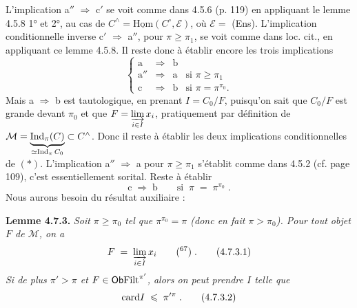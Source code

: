 L’implication a$''$ $\Longrightarrow$ c$'$ se voit comme dans 4.5.6 (p. 119) en appliquant le lemme 4.5.8 1° et 2°, au cas de $C^{\wedge} = \underline{\mathrm{Hom}}(C^{\circ}, \mathcal{E})$, où $\mathcal{E} =$ (Ens). L’implication conditionnelle inverse c$'$ $\Longrightarrow$ a$''$, pour $\pi \geqslant \pi_1$, se voit comme dans loc. cit., en appliquant ce lemme 4.5.8. Il reste donc à établir encore les trois implications
\[
\left\{
\begin{array}{ccll}
\text{a} & \Longrightarrow & \text{b} & \\[4pt]
\text{a}'' & \Longrightarrow & \text{a} & \text{si } \pi \geqslant \pi_1 \\[4pt]
\text{c} & \Longrightarrow & \text{b} & \text{si } \pi = \pi^{\pi_0}.
\end{array}
\right. \tag*{$(*)$}
\]
Mais a $\Longrightarrow$ b est tautologique, en prenant $I = C_0/F$, puisqu’on sait que $C_0/F$ est grande devant $\pi_0$ et que $F = \varinjlim\limits_{i \in I} x_i$, pratiquement par définition de $\mathcal{M} = \underbrace{\operatorname{Ind}_{\pi}(C)}_{\simeq \operatorname{Ind}_{\pi} C_0} \subset C^{\wedge}$. Donc il reste à établir les deux implications conditionnelles de $(*)$. L’implication a$''$ $\Longrightarrow$ a pour $\pi \geqslant \pi_1$ s’établit comme dans 4.5.2 (cf. page 109), c’est essentiellement sorital. Reste à établir
\[
\text{c} \;\Longrightarrow\; \text{b} \qquad \text{si} \;\; \pi \;=\; \pi^{\pi_0} \;. \tag*{$(*)$}
\]
Nous aurons besoin du résultat auxiliaire :

\textbf{Lemme 4.7.3.} \textit{Soit $\pi \geqslant \pi_0$ tel que $\pi^{\pi_0} = \pi$ (donc en fait $\pi > \pi_0$). Pour tout objet $F$ de $\mathcal{M}$, on a}
\[
F \;=\; \varinjlim_{i \in I} x_i \qquad \text{(\footnotemark[67])}\;. \tag*{(4.7.3.1)}
\]
\textit{Si de plus $\pi' > \pi$ et $F \in \mathsf{Ob} \mathrm{Filt}^{\pi'}$, alors on peut prendre $I$ telle que}
\[
\card I \;\leqslant\; \pi'^{\pi} \;. \tag*{(4.7.3.2)}
\]

